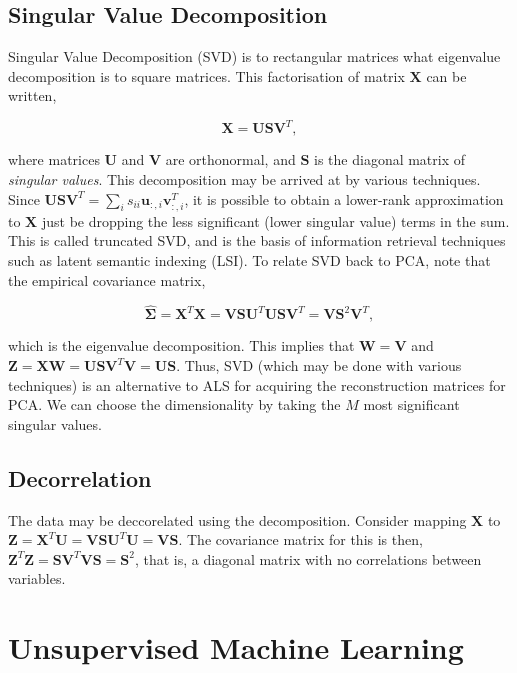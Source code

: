 \documentclass[11pt]{amsart}
\begin{document}
\subsection{Singular Value Decomposition}

Singular Value Decomposition (SVD) is to rectangular matrices what eigenvalue decomposition is to square matrices. This factorisation of matrix $\mathbf{X}$ can be written,

$$\mathbf{X} = \mathbf{U}\mathbf{S}\mathbf{V}^T,$$

where matrices $\mathbf{U}$ and $\mathbf{V}$ are orthonormal, and $\mathbf{S}$ is the diagonal matrix of \emph{singular values}. This decomposition may be arrived at by various techniques. Since $\mathbf{U}\mathbf{S}\mathbf{V}^T = \sum_i s_{ii} \mathbf{u}_{:,i}\mathbf{v}_{:,i}^T$, it is possible to obtain a lower-rank approximation to $\mathbf{X}$ just be dropping the less significant (lower singular value) terms in the sum. This is called truncated SVD, and is the basis of information retrieval techniques such as latent semantic indexing (LSI). To relate SVD back to PCA, note that the empirical covariance matrix,

$$\hat{\boldsymbol\Sigma} = \mathbf{X}^T\mathbf{X} = \mathbf{V}\mathbf{S}\mathbf{U}^T\mathbf{U}\mathbf{S}\mathbf{V}^T =  \mathbf{V}\mathbf{S}^2\mathbf{V}^T,$$

which is the eigenvalue decomposition. This implies that $\mathbf{W} = \mathbf{V}$ and $\mathbf{Z} = \mathbf{X}\mathbf{W} = \mathbf{U}\mathbf{S}\mathbf{V}^T\mathbf{V} = \mathbf{U}\mathbf{S}$. Thus, SVD (which may be done with various techniques) is an alternative to ALS for acquiring the reconstruction matrices for PCA. We can choose the dimensionality by taking the $M$ most significant singular values.

\subsection{Decorrelation}

The data may be deccorelated using the decomposition. Consider mapping $\mathbf{X}$ to $\mathbf{Z} = \mathbf{X}^T\mathbf{U} = \mathbf{V}\mathbf{S}\mathbf{U}^T\mathbf{U} = \mathbf{V}\mathbf{S}$. The covariance matrix for this is then, $\mathbf{Z}^T\mathbf{Z} = \mathbf{S}\mathbf{V}^T\mathbf{V}\mathbf{S} = \mathbf{S}^2$, that is, a diagonal matrix with no correlations between variables.

\section{Unsupervised Machine Learning}
\end{document}

